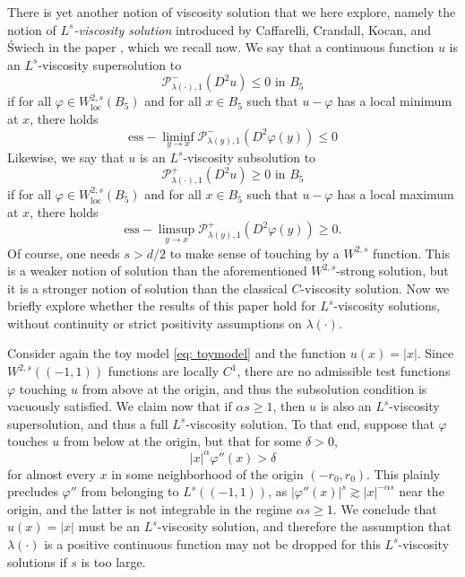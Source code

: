 \documentclass[reqno]{amsart}
\numberwithin{equation}{section}
\numberwithin{equation}{section}
\newcommand{\vphi}{\varphi}
\begin{document}
There is yet another notion of viscosity solution that we here explore, namely the notion of \textit{$L^s$-viscosity solution} introduced by Caffarelli, Crandall, Kocan, and {\'S}wiech in the paper \cite{CaffarelliCrandallKocanSwiech1996}, which we recall now. We say that a continuous function $u$ is an $L^s$-viscosity supersolution to 
$$\mathcal{P}_{\lambda(\cdot),1}^-(D^2u) \le 0 \text{ in } B_5$$
if for all $\vphi \in W^{2,s}_{\text{loc}}(B_5)$ and for all $x \in B_5$ such that $u-\vphi$ has a local minimum at $x$, there holds 
\begin{equation}
\label{eq: L^sviscositysuper}
\text{ess}-\liminf_{y\to x} \mathcal{P}_{\lambda(y),1}^-(D^2\vphi(y)) \le 0
\end{equation}
Likewise, we say that $u$ is an $L^s$-viscosity subsolution to 
$$\mathcal{P}_{\lambda(\cdot),1}^+(D^2u) \ge 0 \text{ in } B_5$$
if for all $\vphi \in W^{2,s}_{\text{loc}}(B_5)$ and for all $x \in B_5$ such that $u-\vphi$ has a local maximum at $x$, there holds 
\begin{equation}
    \label{eq: L^sviscositysub}
    \text{ess}-\limsup_{y\to x} \mathcal{P}_{\lambda(y),1}^+(D^2\vphi(y)) \ge 0.
\end{equation}
Of course, one needs $s>d/2$ to make sense of touching by a $W^{2,s}$ function. This is a weaker notion of solution than the aforementioned $W^{2,s}$-strong solution, but it is a stronger notion of solution than the classical $C$-viscosity solution. Now we briefly explore whether the results of this paper hold for $L^s$-viscosity solutions, without continuity or strict positivity assumptions on $\lambda(\cdot)$. 
\\\par Consider again the toy model \eqref{eq: toymodel} and the function $u(x)=|x|$. Since $W^{2,s}((-1,1))$ functions are locally $C^1$, there are no admissible test functions $\vphi$ touching $u$ from above at the origin, and thus the subsolution condition is vacuously satisfied. We claim now that if $\alpha s \ge 1$, then $u$ is also an $L^s$-viscosity supersolution, and thus a full $L^s$-viscosity solution. To that end, suppose that $\vphi$ touches $u$ from below at the origin, but that for some $\delta>0$,
$$|x|^\alpha \vphi''(x) >\delta$$
for almost every $x$ in some neighborhood of the origin $(-r_0, r_0)$. This plainly precludes $\vphi''$ from belonging to $L^s((-1,1))$, as $|\vphi''(x)|^s \gtrsim |x|^{-\alpha s}$ near the origin, and the latter is not integrable in the regime $\alpha s \ge 1.$ We conclude that $u(x)=|x|$ must be an $L^s$-viscosity solution, and therefore the assumption that $\lambda(\cdot)$ is a positive continuous function may not be dropped for this $L^s$-viscosity solutions if $s$ is too large. 
\end{document}
